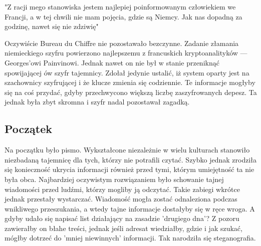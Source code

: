 \documentclass[10pt, a4paper, titlepage]{article}
\begin{document}
\begin{center}
"Z racji mego stanowiska jestem najlepiej poinformowanym człowiekiem we Francji, a w tej chwili nie mam pojęcia, gdzie są Niemcy. Jak nas dopadną za godzinę, nawet się nie zdziwię"\cite{[1]}
\end{center}
Oczywiście Bureau du Chiffre nie pozostawało bezczynne. Zadanie złamania niemieckiego szyfru powierzono najlepszemu z francuskich kryptoanalityków — Georges’owi Painvinowi. Jednak nawet on nie był w stanie przeniknąć spowijającej ów szyfr tajemnicy. Zdołał jedynie ustalić, iż system oparty jest na szachownicy szyfrującej i że klucze zmienia się codziennie. Te informacje mogłyby się na coś przydać, gdyby przechwycono większą liczbę zaszyfrowanych depesz. Ta jednak była zbyt skromna i szyfr nadal pozostawał zagadką.\\

\subsection{Początek}
Na początku było pismo. Wykształcone niezależnie w wielu kulturach stanowiło niezbadaną tajemnicę dla tych, którzy nie potrafili czytać. Szybko jednak zrodziła się konieczność ukrycia informacji również przed tymi, którym umiejętność ta nie była obca. Najbardziej oczywistym rozwiązaniem było schowanie tajnej wiadomości przed ludźmi, którzy mogliby ją odczytać. Takie zabiegi wkrótce jednak przestały wystarczać. Wiadomość mogła zostać odnaleziona podczas wnikliwego przeszukania, a wtedy tajne informacje dostałyby się w ręce wroga. A gdyby udało się napisać list działający na zasadzie 'drugiego dna'? Z pozoru zawierałby on błahe treści, jednak jeśli adresat wiedziałby, gdzie i jak szukać, mógłby dotrzeć do 'mniej niewinnych' informacji. Tak narodziła się steganografia.
\end{document}
